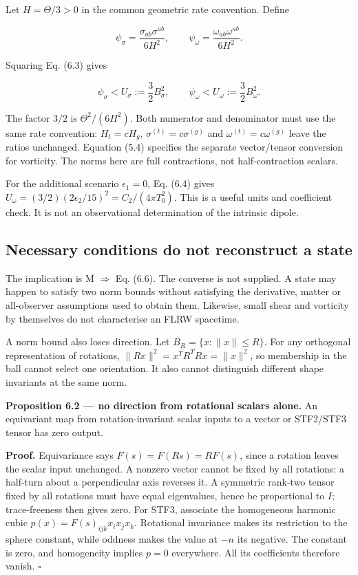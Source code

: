 \documentclass[
  11pt,
  a4paper]{article}
\begin{document}
Let \(H=\Theta/3>0\) in the common geometric rate convention. Define

\[
\psi_\sigma=\frac{\sigma_{ab}\sigma^{ab}}{6H^2},\qquad
\psi_\omega=\frac{\omega_{ab}\omega^{ab}}{6H^2}.
\tag{6.5}
\]

Squaring Eq. (6.3) gives

\[
\boxed{\psi_\sigma<U_\sigma:=\frac32B_\sigma^2},\qquad
\boxed{\psi_\omega<U_\omega:=\frac32B_\omega^2}.
\tag{6.6}
\]

The factor \(3/2\) is \(\Theta^2/(6H^2)\). Both numerator and denominator must use the same rate convention: \(H_t=cH_g\), \(\sigma^{(t)}=c\sigma^{(g)}\) and \(\omega^{(t)}=c\omega^{(g)}\) leave the ratios unchanged. Equation (5.4) specifies the separate vector/tensor conversion for vorticity. The norms here are full contractions, not half-contraction scalars.

For the additional scenario \(\epsilon_1=0\), Eq. (6.4) gives
\(U_\omega=(3/2)(2\epsilon_2/15)^2=C_2/(4\pi T_0^2)\). This is a useful units and coefficient check. It is not an observational determination of the intrinsic dipole.

\hypertarget{necessary-conditions-do-not-reconstruct-a-state}{%
\subsection{Necessary conditions do not reconstruct a state}\label{necessary-conditions-do-not-reconstruct-a-state}}

The implication is M \(\Rightarrow\) Eq. (6.6). The converse is not supplied. A state may happen to satisfy two norm bounds without satisfying the derivative, matter or all-observer assumptions used to obtain them. Likewise, small shear and vorticity by themselves do not characterise an FLRW spacetime.

A norm bound also loses direction. Let \(B_R=\{x:\|x\|\le R\}\). For any orthogonal representation of rotations, \(\|Rx\|^2=x^TR^TRx=\|x\|^2\), so membership in the ball cannot select one orientation. It also cannot distinguish different shape invariants at the same norm.

\textbf{Proposition 6.2 --- no direction from rotational scalars alone.} An equivariant map from rotation-invariant scalar inputs to a vector or STF2/STF3 tensor has zero output.

\textbf{Proof.} Equivariance says \(F(s)=F(Rs)=RF(s)\), since a rotation leaves the scalar input unchanged. A nonzero vector cannot be fixed by all rotations: a half-turn about a perpendicular axis reverses it. A symmetric rank-two tensor fixed by all rotations must have equal eigenvalues, hence be proportional to \(I\); trace-freeness then gives zero. For STF3, associate the homogeneous harmonic cubic \(p(x)=F(s)_{ijk}x_ix_jx_k\). Rotational invariance makes its restriction to the sphere constant, while oddness makes the value at \(-n\) its negative. The constant is zero, and homogeneity implies \(p=0\) everywhere. All its coefficients therefore vanish. \(\square\)
\end{document}
